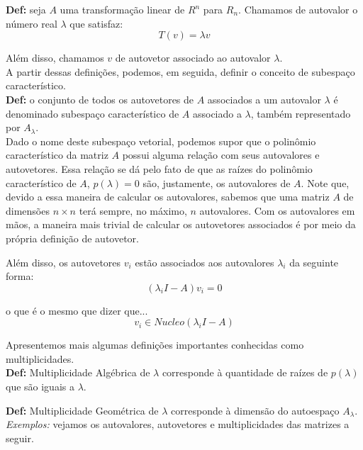 \documentclass[12pt]{article}
\begin{document}
	\textbf{Def:} seja $A$ uma transformação linear de $R^n$ para $R_n$. Chamamos de autovalor o número real $\lambda$ que satisfaz:
	\begin{equation*}
		T(v)=\lambda v
	\end{equation*}
	
	Além disso, chamamos $v$ de autovetor associado ao autovalor $\lambda$.\\
	
	A partir dessas definições, podemos, em seguida, definir o conceito de subespaço característico.\\
	
	\textbf{Def:} o conjunto de todos os autovetores de $A$ associados a um autovalor $\lambda$ é denominado subespaço característico de $A$ associado a $\lambda$, também representado por $A_{\lambda}$.\\
	
	Dado o nome deste subespaço vetorial, podemos supor que o polinômio característico da matriz $A$ possui alguma relação com seus autovalores e autovetores. Essa relação se dá pelo fato de que as raízes do polinômio característico de $A$, $p(\lambda)=0$ são, justamente, os autovalores de $A$. Note que, devido a essa maneira de calcular os autovalores, sabemos que uma matriz $A$ de dimensões $n\times n$ terá sempre, no máximo, $n$ autovalores. Com os autovalores em mãos, a maneira mais trivial de calcular os autovetores associados é por meio da própria definição de autovetor.
	
	Além disso, os autovetores $v_i$ estão associados aos autovalores $\lambda_i$ da seguinte forma:
	\begin{equation*}
		(\lambda_iI-A)v_i=0
	\end{equation*}
	
	o que é o mesmo que dizer que...
	\begin{equation*}
		v_i \in Nucleo(\lambda_iI-A)
	\end{equation*}
	
	Apresentemos mais algumas definições importantes conhecidas como multiplicidades.\\
	
	\textbf{Def:} Multiplicidade Algébrica de $\lambda$ corresponde à quantidade de raízes de $p(\lambda)$ que são iguais a $\lambda$.
	
	\textbf{Def:} Multiplicidade Geométrica de $\lambda$ corresponde à dimensão do autoespaço $A_{\lambda}$.\\
	
	\textit{Exemplos:} vejamos os autovalores, autovetores e multiplicidades das matrizes a seguir.
	
\end{document}
